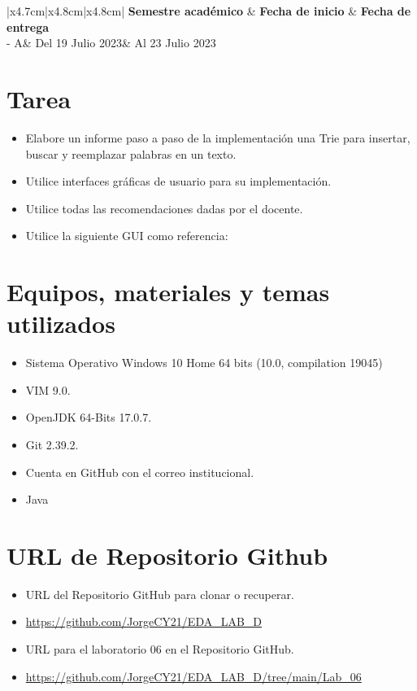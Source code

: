 \documentclass{article}
\newcommand{\itemAcademic}{2023 - A}
\newcommand{\itemInput}{Del 19 Julio 2023}
\newcommand{\itemOutput}{Al 23 Julio 2023}
\begin{document}
	\begin{table}[H]
		\begin{tabular}{|x{4.7cm}|x{4.8cm}|x{4.8cm}|}
			\hline 
			\color{white}\textbf{Semestre académico} & \color{white}\textbf{Fecha de inicio}  & \color{white}\textbf{Fecha de entrega}   \\
			\hline 
			\itemAcademic & \itemInput &  \itemOutput  \\
			\hline 
		\end{tabular}
	\end{table}
	
	\section{Tarea}
	\begin{itemize}		
		\item Elabore un informe paso a paso de la implementación una Trie para insertar, buscar y reemplazar palabras en un texto.
		\item Utilice interfaces gráficas de usuario para su implementación.
		\item Utilice todas las recomendaciones dadas por el docente.
		\item Utilice la siguiente GUI como referencia:
		
	\end{itemize}
		 
		
	\section{Equipos, materiales y temas utilizados}
	\begin{itemize}
		\item Sistema Operativo Windows 10 Home 64 bits (10.0, compilation 19045)
		\item VIM 9.0.
		\item OpenJDK 64-Bits 17.0.7.
		\item Git 2.39.2.
		\item Cuenta en GitHub con el correo institucional.
		\item Java 
	\end{itemize}
	
	\section{URL de Repositorio Github}
	\begin{itemize}
		\item URL del Repositorio GitHub para clonar o recuperar.
		\item \url{https://github.com/JorgeCY21/EDA_LAB_D}
		\item URL para el laboratorio 06 en el Repositorio GitHub.
		\item \url{https://github.com/JorgeCY21/EDA_LAB_D/tree/main/Lab_06}
	\end{itemize}
	
\end{document}
